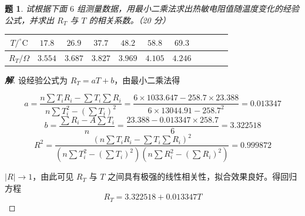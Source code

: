 \documentclass{article}
\newtheorem{problem}{题}
\newenvironment{solution}
{\begin{proof}[\textbf{解}]\renewcommand{\qedsymbol}{}}
{\end{proof}}
\begin{document}
\begin{problem}
试根据下面 $6$ 组测量数据，用最小二乘法求出热敏电阻值随温度变化的经验公式，并求出 $R_T$ 与 $T$ 的相关系数。（20 分）

\begin{table}[h]
\centering
\begin{tabular}{ccccccccccc}
\toprule
$T / ^\circ\text{C}$ & $17.8$ & $26.9$ & $37.7$ & $48.2$ & $58.8$ & $69.3$  \\ \midrule
$R_T / \Omega$ & $3.554$ & $3.687$ & $3.827$ & $3.969$ & $4.105$ & $4.246$ \\ \bottomrule
\end{tabular}
\end{table}
\end{problem}

\begin{solution}

设经验公式为 $R_T = aT + b$，由最小二乘法得 

\[
    a = \frac{n \sum T_i R_i - \sum T_i \sum R_i}{n \sum T_i^2 - \left(\sum T_i\right)^2} = \frac{6 \times 1033.647 - 258.7 \times 23.388}{6 \times 13044.91 - 258.7^2} = 0.013347
\]
\[
    b = \frac{\sum R_i - A \sum T_i}{n} = \frac{23.388 - 0.013347 \times 258.7}{6} = 3.322518
\]
\[
    R^2 = \frac{\left(n \sum T_i R_i - \sum T_i \sum R_i\right)^2}{{\left(n \sum T_i^2 - \left(\sum T_i\right)^2\right)\left(n \sum R_i^2 - \left(\sum R_i\right)^2\right)}} = 0.999872
\]

\begin{center}
\end{center}

$|R| \to 1$，由此可见 $R_T$ 与 $T$ 之间具有极强的线性相关性，拟合效果良好。得回归方程
\[
R_T = 3.322518 + 0.013347T
\]
\end{solution}
\end{document}
